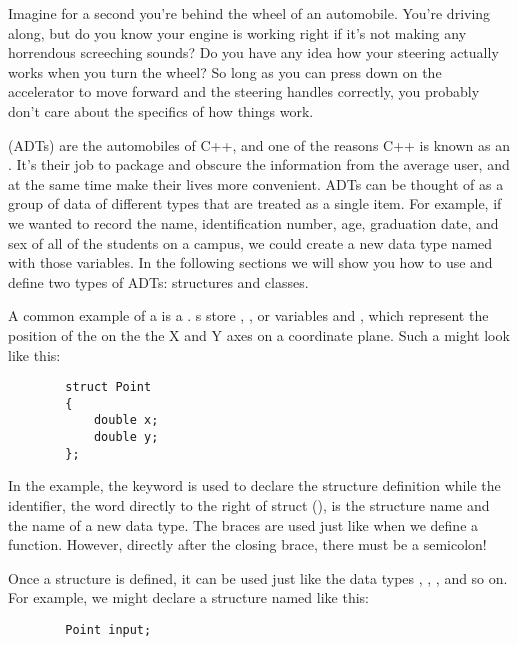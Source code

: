 

Imagine for a second you're behind the wheel of an automobile. 
You're driving along, but do you know your engine is working right if it's not making any horrendous screeching sounds? 
Do you have any idea how your steering actually works when you turn the wheel? 
So long as you can press down on the accelerator to move forward and the steering handles correctly, you probably don't care about the specifics of how things work.

 (ADTs) are the automobiles of C++, and one of the reasons C++ is known as an . 
It's their job to package and obscure the information from the average user, and at the same time make their lives more convenient.
ADTs can be thought of as a group of data of different types that are treated as a single item.
For example, if we wanted to record the name, identification number, age, graduation date, and sex of all of the students on a campus, we could create a new data type named  with those variables.
In the following sections we will show you how to use and define two types of ADTs: structures and classes. 



A common example of a  is a . s store , , or  variables  and , which represent the position of the  on the the X and Y axes on a coordinate plane. 
Such a  might look like this:

\begin{lstlisting}
		struct Point
		{
			double x;
			double y;
		};
\end{lstlisting}

In the example, the keyword  is used to declare the structure definition while the identifier, the word directly to the right of struct (), is the structure name and the name of a new data type.
The braces are used just like when we define a function.
However, directly after the closing brace, there must be a semicolon!

Once a structure is defined, it can be used just like the data types , , , and so on. 
For example, we might declare a  structure named  like this:

\begin{lstlisting}
		Point input;
\end{lstlisting}

